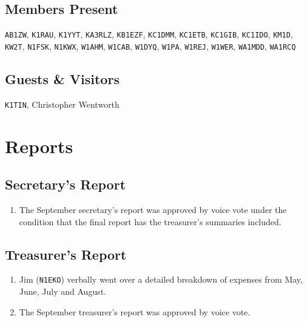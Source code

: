 \documentclass[10pt,letterpaper]{article}
\begin{document}
\subsection{Members Present}

\texttt{AB1ZW},
\texttt{K1RAU},
\texttt{K1YYT},
\texttt{KA3RLZ},
\texttt{KB1EZF},
\texttt{KC1DMM},
\texttt{KC1ETB},
\texttt{KC1GIB},
\texttt{KC1IDO},
\texttt{KM1D},
\texttt{KW2T},
\texttt{N1FSK},
\texttt{N1KWX},
\texttt{W1AHM},
\texttt{W1CAB},
\texttt{W1DYQ},
\texttt{W1PA},
\texttt{W1REJ},
\texttt{W1WER},
\texttt{WA1MDD},
\texttt{WA1RCQ}

\subsection{Guests \& Visitors}

\texttt{K1TIN}, 
Christopher Wentworth


\section{Reports}

\subsection{Secretary's Report}
\begin{enumerate}
  \item The September secretary's report was approved by voice vote under the condition that the final report has the treasurer's summaries included.
\end{enumerate}

\newpage
\subsection{Treasurer's Report}
\begin{enumerate}
  \item Jim (\texttt{N1EKO}) verbally went over a detailed breakdown of expenses from May, June, July and August.
  \item The September treasurer's report was approved by voice vote.
\end{enumerate}
\end{document}
